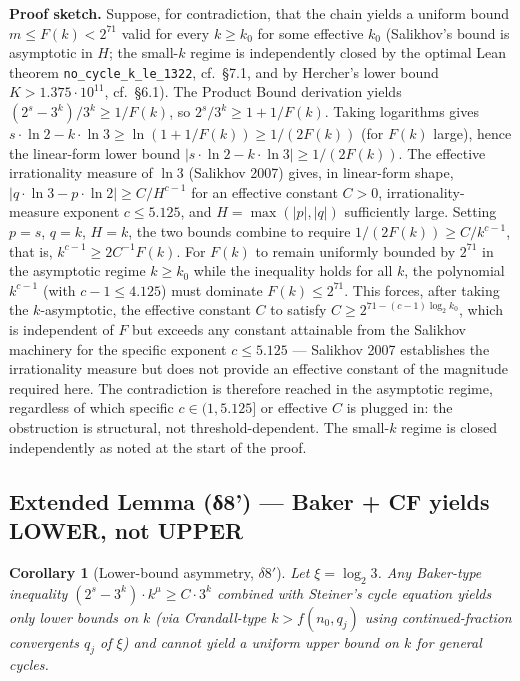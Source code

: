 \documentclass[
  11pt]{amsart}
\theoremstyle{plain}
\newtheorem{corollary}[theorem]{Corollary}
\theoremstyle{definition}
\theoremstyle{remark}
\begin{document}
\textbf{Proof sketch.} Suppose, for contradiction, that the chain yields
a uniform bound \(m \leq F(k) < 2^{71}\) valid for every \(k \geq k_0\)
for some effective \(k_0\) (Salikhov's bound is asymptotic in \(H\); the
small-\(k\) regime is independently closed by the optimal Lean theorem
\texttt{no\_cycle\_k\_le\_1322}, cf.~§7.1, and by Hercher's lower bound
\(K > 1.375 \cdot 10^{11}\), cf.~§6.1). The Product Bound derivation
yields \((2^s - 3^k)/3^k \geq 1/F(k)\), so \(2^s/3^k \geq 1 + 1/F(k)\).
Taking logarithms gives
\(s \cdot \ln 2 - k \cdot \ln 3 \geq \ln(1 + 1/F(k)) \geq 1/(2 F(k))\)
(for \(F(k)\) large), hence the linear-form lower bound
\(|s \cdot \ln 2 - k \cdot \ln 3| \geq 1/(2 F(k))\). The effective
irrationality measure of \(\ln 3\) (Salikhov 2007) gives, in linear-form
shape, \(|q \cdot \ln 3 - p \cdot \ln 2| \geq C / H^{c-1}\) for an
effective constant \(C > 0\), irrationality-measure exponent
\(c \leq 5.125\), and \(H = \max(|p|, |q|)\) sufficiently large. Setting
\(p = s\), \(q = k\), \(H = k\), the two bounds combine to require
\(1/(2 F(k)) \geq C / k^{c-1}\), that is,
\(k^{c-1} \geq 2 C^{-1} F(k)\). For \(F(k)\) to remain uniformly bounded
by \(2^{71}\) in the asymptotic regime \(k \geq k_0\) while the
inequality holds for all \(k\), the polynomial \(k^{c-1}\) (with
\(c - 1 \leq 4.125\)) must dominate \(F(k) \leq 2^{71}\). This forces,
after taking the \(k\)-asymptotic, the effective constant \(C\) to
satisfy \(C \geq 2^{71 - (c-1)\log_2 k_0}\), which is independent of
\(F\) but exceeds any constant attainable from the Salikhov machinery
for the specific exponent \(c \leq 5.125\) --- Salikhov 2007 establishes
the irrationality measure but does not provide an effective constant of
the magnitude required here. The contradiction is therefore reached in
the asymptotic regime, regardless of which specific \(c \in (1, 5.125]\)
or effective \(C\) is plugged in: the obstruction is structural, not
threshold-dependent. The small-\(k\) regime is closed independently as
noted at the start of the proof.

\subsection{Extended Lemma (δ8') --- Baker + CF yields LOWER, not
UPPER}\label{extended-lemma-ux3b48-baker-cf-yields-lower-not-upper}

\begin{corollary}[Lower-bound asymmetry, $\delta 8'$]
\label{cor:lowerasymmetry}
Let $\xi = \log_2 3$. Any Baker-type inequality $(2^s - 3^k) \cdot
k^{\mu} \geq C \cdot 3^k$ combined with Steiner's cycle equation
yields only \emph{lower} bounds on $k$ (via Crandall-type
$k > f(n_0, q_j)$ using continued-fraction convergents $q_j$ of
$\xi$) and cannot yield a uniform \emph{upper} bound on $k$ for
general cycles.
\end{corollary}
\end{document}
